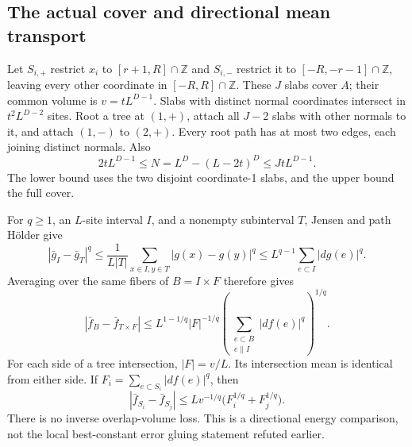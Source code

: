 \subsection{The actual cover and directional mean transport}
Let $S_{i,+}$ restrict $x_i$ to $[r+1,R]\cap\mathbb Z$ and $S_{i,-}$
restrict it to $[-R,-r-1]\cap\mathbb Z$, leaving every other coordinate
in $[-R,R]\cap\mathbb Z$. These $J$ slabs cover $A$; their common volume is
$v=tL^{D-1}$. Slabs with distinct normal coordinates intersect in
$t^2L^{D-2}$ sites. Root a tree at $(1,+)$, attach all $J-2$ slabs with
other normals to it, and attach $(1,-)$ to $(2,+)$. Every root path has
at most two edges, each joining distinct normals. Also
\begin{equation}\label{eq:shell217-volume}
 2tL^{D-1}\leq N=L^D-(L-2t)^D\leq JtL^{D-1}.
\end{equation}
The lower bound uses the two disjoint coordinate-1 slabs, and the upper
bound the full cover.

For $q\geq1$, an $L$-site interval $I$, and a nonempty subinterval $T$,
Jensen and path H\"older give
\[
 |\bar g_I-\bar g_T|^q
 \leq\frac1{L|T|}\sum_{x\in I,y\in T}|g(x)-g(y)|^q
 \leq L^{q-1}\sum_{e\subset I}|dg(e)|^q.
\]
Averaging over the same fibers of $B=I\times F$ therefore gives
\begin{equation}\label{eq:shell217-transport}
 |\bar f_B-\bar f_{T\times F}|
 \leq L^{1-1/q}|F|^{-1/q}
       \left(\sum_{\substack{e\subset B\\ e\parallel I}}|df(e)|^q\right)^{1/q}.
\end{equation}
For each side of a tree intersection, $|F|=v/L$. Its intersection mean
is identical from either side. If $F_i=\sum_{e\subset S_i}|df(e)|^q$,
then
\begin{equation}\label{eq:shell217-edge}
 |\bar f_{S_i}-\bar f_{S_j}|
 \leq Lv^{-1/q}\bigl(F_i^{1/q}+F_j^{1/q}\bigr).
\end{equation}
There is no inverse overlap-volume loss. This is a directional energy
comparison, not the local best-constant error gluing statement refuted earlier.

